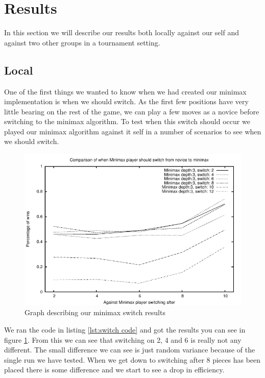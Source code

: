 \section{Results}\label{results}
In this section we will describe our results both locally against our self and
against two other groups in a tournament setting.

\subsection{Local}\label{results:local}
One of the first things we wanted to know when we had created our minimax 
implementation is when we should switch. As the first few positions have very
little bearing on the rest of the game, we can play a few moves as a novice
before switching to the minimax algorithm. To test when this switch should
occur we played our minimax algorithm against it self in a number of scenarios
to see when we should switch. 

\begin{figure}[h]
	\includegraphics{graphs/switch.pdf}
	\caption[Minimax switch graph]{Graph describing our minimax switch results}
	\label{fig:minimax switch}
\end{figure}

We ran the code in listing \ref{lst:switch code} and got the results you can see in figure
\ref{fig:minimax switch}. From this we can see that switching on 2, 4 and 6 is 
really not any different.
The small difference we can see is just random variance because of the single
run we have tested. When we get down to switching after 8 pieces has been placed
there is some difference and we start to see a drop in efficiency.

